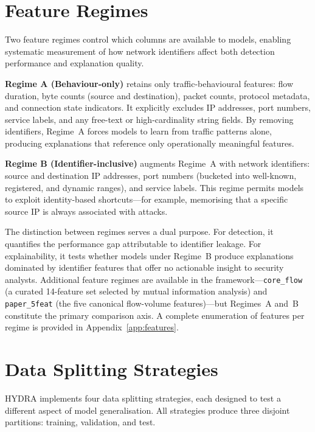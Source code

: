 \documentclass[12pt,a4paper]{report}
\begin{document}
\section{Feature Regimes}
\label{sec:regimes}

Two feature regimes control which columns are available to models, enabling systematic measurement of how network identifiers affect both detection performance and explanation quality.

\textbf{Regime A (Behaviour-only)} retains only traffic-behavioural features: flow duration, byte counts (source and destination), packet counts, protocol metadata, and connection state indicators. It explicitly excludes IP addresses, port numbers, service labels, and any free-text or high-cardinality string fields. By removing identifiers, Regime~A forces models to learn from traffic patterns alone, producing explanations that reference only operationally meaningful features.

\textbf{Regime B (Identifier-inclusive)} augments Regime~A with network identifiers: source and destination IP addresses, port numbers (bucketed into well-known, registered, and dynamic ranges), and service labels. This regime permits models to exploit identity-based shortcuts---for example, memorising that a specific source IP is always associated with attacks.

The distinction between regimes serves a dual purpose. For detection, it quantifies the performance gap attributable to identifier leakage. For explainability, it tests whether models under Regime~B produce explanations dominated by identifier features that offer no actionable insight to security analysts. Additional feature regimes are available in the framework---\texttt{core\_flow} (a curated 14-feature set selected by mutual information analysis) and \texttt{paper\_5feat} (the five canonical flow-volume features)---but Regimes~A and~B constitute the primary comparison axis. A complete enumeration of features per regime is provided in Appendix~\ref{app:features}.

\section{Data Splitting Strategies}
\label{sec:splitting}

HYDRA implements four data splitting strategies, each designed to test a different aspect of model generalisation. All strategies produce three disjoint partitions: training, validation, and test.
\end{document}
